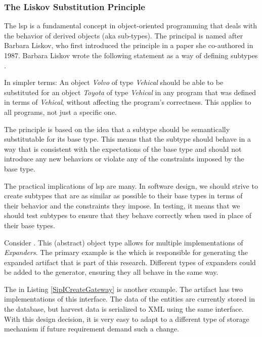 \subsubsection{The Liskov Substitution Principle} \label{subsubsec:lsp}


The \gls{lsp} is a fundamental concept in object-oriented programming that deals with the
behavior of derived objects (aka sub-types). The principal is named after Barbara Liskov,
who first introduced the principle in a paper she co-authored in 1987. Barbara Liskov
wrote the following statement as a way of defining subtypes
\parencite[95]{robert_c_martin_clean_2018}.


In simpler terms: An object \textit{Volvo} of type \textit{Vehical} should be
able to be substituted for an object \textit{Toyota} of type \textit{Vehical} in any
program that was defined in terms of \textit{Vehical}, without affecting the program's
correctness. This applies to all programs, not just a specific one.

The principle is based on the idea that a subtype should be semantically substitutable for
its base type. This means that the subtype should behave in a way that is consistent with
the expectations of the base type and should not introduce any new behaviors or violate
any of the constraints imposed by the base type.

The practical implications of \gls{lsp} are many. In software design, we should strive to
create subtypes that are as similar as possible to their base types in terms of their
behavior and the constraints they impose. In testing, it means that we should test
subtypes to ensure that they behave correctly when used in place of their base types.

Consider . This (abstract) object type allows for
multiple implementations of \textit{Expanders}. The primary example is the
 which is responsible for generating the
expanded artifact that is part of this research. Different types of expanders could be
added to the generator, ensuring they all behave in the same way.

The  in Listing \ref{SipICreateGateway} is another
example. The artifact has two implementations of this interface. The data of the entities
are currently stored in the database, but harvest data is serialized to XML using the same
 interface. With this design decision, it is very easy to adapt
to a different type of storage mechanism if future requirement demand such a change.


